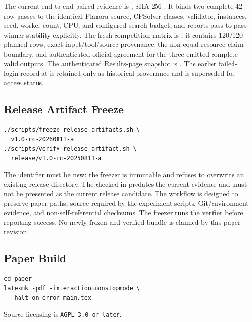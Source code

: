 The current end-to-end paired evidence is , SHA-256 .
It binds two complete 42-row passes to the identical Planora source, CPSolver classes, validator, instances, seed, worker count, CPU, and configured search budget, and reports pass-to-pass winner stability explicitly.
The fresh competition matrix is ; it contains 120/120 planned rows, exact input/tool/source provenance, the non-equal-resource claim boundary, and authenticated official agreement for the three emitted complete valid outputs. The authenticated Results-page snapshot is . The earlier failed-login record at  is retained only as historical provenance and is superseded for access status.

\subsection*{Release Artifact Freeze}
\begingroup\small
\begin{verbatim}
./scripts/freeze_release_artifacts.sh \
  v1.0-rc-20260811-a
./scripts/verify_release_artifact.sh \
  release/v1.0-rc-20260811-a
\end{verbatim}
\endgroup
The identifier must be new: the freezer is immutable and refuses to overwrite an existing release directory. The checked-in  predates the current evidence and must not be presented as the current release candidate.
The workflow is designed to preserve paper paths, source required by the experiment scripts, Git/environment evidence, and non-self-referential checksums.
The freezer runs the verifier before reporting success.
No newly frozen and verified bundle is claimed by this paper revision.

\subsection*{Paper Build}
\begingroup\small
\begin{verbatim}
cd paper
latexmk -pdf -interaction=nonstopmode \
  -halt-on-error main.tex
\end{verbatim}
\endgroup

Source licensing is \texttt{AGPL-3.0-or-later}.

